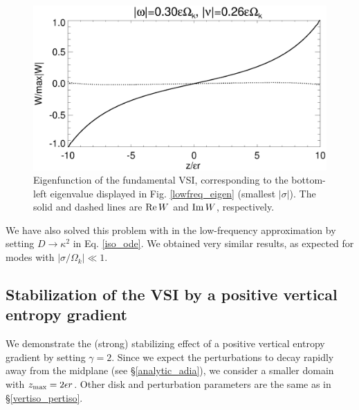 \begin{figure}
  \includegraphics[width=\linewidth]{figures/eigenvector_iso}
  \caption{Eigenfunction of the fundamental VSI,
    corresponding to the bottom-left eigenvalue displayed in
    Fig. \ref{lowfreq_eigen} (smallest $|\sigma|$). The
    solid and dashed lines are $\operatorname{Re} W$ and $\operatorname{Im} W$, respectively. 
    \label{lowfreq_eigenfunc}
  }
\end{figure}

We have also solved this problem with in the low-frequency 
approximation by setting $D\to\kappa^2$ in Eq. \ref{iso_ode}. We
obtained very similar results, as expected for modes with
$|\sigma/\Omega_k|\ll1$. 

\subsection{Stabilization of the VSI by a positive vertical entropy
  gradient}
We demonstrate the (strong) stabilizing effect of a  
positive vertical entropy gradient by setting $\gamma=2$.  
Since we expect the perturbations to decay rapidly
away from the midplane (see \S\ref{analytic_adia}), we consider a
smaller domain with $z_\mathrm{max} = 2\epsilon r$. 
Other disk and perturbation parameters are the same as in
\S\ref{vertiso_pertiso}.    


